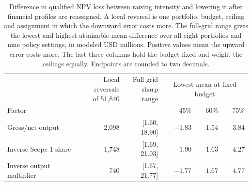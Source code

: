 \ifdefined\readingcopy\begin{table}[!t]\else\begin{table}[!ht]\fi\centering
\caption{Difference in qualified NPV loss between raising intensity and lowering it after financial profiles are reassigned. A local reversal is one portfolio, budget, ceiling and assignment in which the downward error costs more. The full-grid range gives the lowest and highest attainable mean difference over all eight portfolios and nine policy settings, in modeled USD millions. Positive values mean the upward error costs more. The last three columns hold the budget fixed and weight the ceilings equally. Endpoints are rounded to two decimals.}\label{tab:assignment}
\footnotesize\setlength{\tabcolsep}{4pt}
\begin{tabularx}{\linewidth}{@{}Xrrrrr@{}}\toprule
 &\shortstack[r]{Local reversals\\of 51,840} & \shortstack[r]{Full grid\\sharp range} &\multicolumn{3}{c}{Lowest mean at fixed budget}\\
\cmidrule(l){4-6}
Factor & & & 45\% & 60\% & 75\%\\\midrule
Gross/net output & 2,098 & [1.60, 18.90] & $-1.83$ & $1.54$ & $3.84$\\
Inverse Scope 1 share & 1,748 & [1.69, 21.03] & $-1.90$ & $1.63$ & $4.27$\\
Inverse output multiplier & 740 & [1.67, 21.77] & $-1.77$ & $1.67$ & $4.77$\\\bottomrule
\end{tabularx}
\ifdefined\readingcopy\end{table}\else\end{table}\fi
